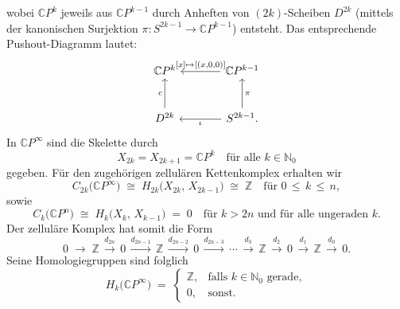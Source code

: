 \documentclass[12pt]{article}
\numberwithin{conj}{section}
\begin{document}
                wobei \(\mathbb{C}P^k\) jeweils aus \(\mathbb{C}P^{k-1}\) durch Anheften von \((2k)\)-Scheiben \(D^{2k}\) (mittels der kanonischen Surjektion \(\pi \colon S^{2k-1} \to \mathbb{C}P^{k-1}\)) entsteht. Das entsprechende Pushout-Diagramm lautet:
                \[\begin{tikzcd}[sep=large]
                    {\mathbb{C}P^k} & {\mathbb{C}P^{k-1}} \\
                    {D^{2k}} & {S^{2k-1}}.
                    \arrow["{[x] \mapsto[(x,0,0)]}"', from=1-2, to=1-1]
                    \arrow["c", from=2-1, to=1-1]
                    \arrow["\pi"', from=2-2, to=1-2]
                    \arrow["\iota", from=2-2, to=2-1]
                    \end{tikzcd}\]
                    In \(\mathbb{C}P^\infty\) sind die Skelette durch
                    \[
                        X_{2k} = X_{2k+1} = \mathbb{C}P^k
                        \quad
                        \text{für alle } k \in \mathbb{N}_0
                    \]
                    gegeben. Für den zugehörigen zellulären Kettenkomplex erhalten wir
                    \[
                        C_{2k}\bigl(\mathbb{C}P^\infty\bigr)
                        \;\cong\;
                        H_{2k}\bigl(X_{2k},\,X_{2k-1}\bigr)
                        \;\cong\;
                        \mathbb{Z}
                        \quad
                        \text{für }
                        0 \,\leq\, k \,\leq\, n,
                    \]
                    sowie 
                    \[
                        C_k\bigl(\mathbb{C}P^n\bigr)
                        \;\cong\;
                        H_k\bigl(X_k,\,X_{k-1}\bigr) 
                        \;=\; 0
                        \quad
                        \text{für }
                        k > 2n
                        \text{ und für alle ungeraden } k.
                    \]
                    Der zelluläre Komplex hat somit die Form
                    \[
                        0 \;\longrightarrow\;
                        \mathbb{Z}
                        \,\xrightarrow{d_{2n}}\,
                        0
                        \,\xrightarrow{d_{2n-1}}\,
                        \mathbb{Z}
                        \,\xrightarrow{d_{2n-2}}\,
                        0
                        \,\xrightarrow{d_{2n-3}}\,
                        \cdots
                        \,\xrightarrow{d_{3}}\,
                        \mathbb{Z}
                        \,\xrightarrow{d_{2}}\,
                        0
                        \,\xrightarrow{d_{1}}\,
                        \mathbb{Z}
                        \,\xrightarrow{d_{0}}\,
                        0.
                    \]
                    Seine Homologiegruppen sind folglich
                    \[
                        H_k\bigl(\mathbb{C}P^\infty\bigr)
                        \;=\;
                        \begin{cases}
                            \mathbb{Z}, & \text{falls } k \in \mathbb{N}_0 \text{ gerade}, \\
                            0,          & \text{sonst}.                                    
                        \end{cases}
                    \]
                    
\end{document}
